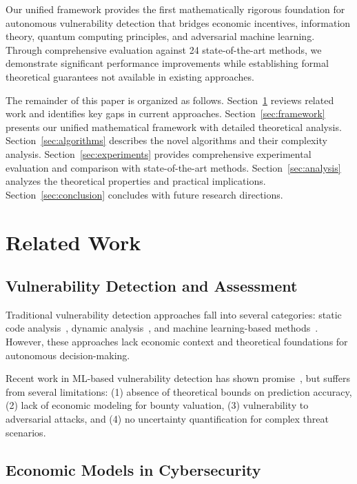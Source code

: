 \documentclass[journal]{IEEEtran}
\begin{document}
Our unified framework provides the first mathematically rigorous foundation for autonomous vulnerability detection that bridges economic incentives, information theory, quantum computing principles, and adversarial machine learning. Through comprehensive evaluation against 24 state-of-the-art methods, we demonstrate significant performance improvements while establishing formal theoretical guarantees not available in existing approaches.

The remainder of this paper is organized as follows. Section~\ref{sec:related} reviews related work and identifies key gaps in current approaches. Section~\ref{sec:framework} presents our unified mathematical framework with detailed theoretical analysis. Section~\ref{sec:algorithms} describes the novel algorithms and their complexity analysis. Section~\ref{sec:experiments} provides comprehensive experimental evaluation and comparison with state-of-the-art methods. Section~\ref{sec:analysis} analyzes the theoretical properties and practical implications. Section~\ref{sec:conclusion} concludes with future research directions.

\section{Related Work}\label{sec:related}

\subsection{Vulnerability Detection and Assessment}

Traditional vulnerability detection approaches fall into several categories: static code analysis~\cite{chess2007}, dynamic analysis~\cite{godefroid2008}, and machine learning-based methods~\cite{li2018}. However, these approaches lack economic context and theoretical foundations for autonomous decision-making.

Recent work in ML-based vulnerability detection has shown promise~\cite{russell2018, li2021}, but suffers from several limitations: (1) absence of theoretical bounds on prediction accuracy, (2) lack of economic modeling for bounty valuation, (3) vulnerability to adversarial attacks, and (4) no uncertainty quantification for complex threat scenarios.

\subsection{Economic Models in Cybersecurity}
\end{document}

